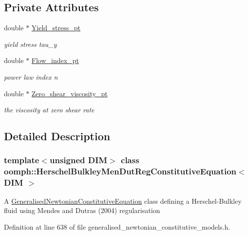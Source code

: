 \subsection*{Private Attributes}
\begin{DoxyCompactItemize}
\item 
double $\ast$ \hyperlink{classoomph_1_1HerschelBulkleyMenDutRegConstitutiveEquation_aaf7844f5794416ec2e625bf6c326b34f}{Yield\+\_\+stress\+\_\+pt}
\begin{DoxyCompactList}\small\item\em yield stress tau\+\_\+y \end{DoxyCompactList}\item 
double $\ast$ \hyperlink{classoomph_1_1HerschelBulkleyMenDutRegConstitutiveEquation_adb825a9e34ad0ab06023bfcfe6425f7d}{Flow\+\_\+index\+\_\+pt}
\begin{DoxyCompactList}\small\item\em power law index n \end{DoxyCompactList}\item 
double $\ast$ \hyperlink{classoomph_1_1HerschelBulkleyMenDutRegConstitutiveEquation_abe037e5299047cce1ef25e2ea1aebe3f}{Zero\+\_\+shear\+\_\+viscosity\+\_\+pt}
\begin{DoxyCompactList}\small\item\em the viscosity at zero shear rate \end{DoxyCompactList}\end{DoxyCompactItemize}


\subsection{Detailed Description}
\subsubsection*{template$<$unsigned D\+IM$>$\newline
class oomph\+::\+Herschel\+Bulkley\+Men\+Dut\+Reg\+Constitutive\+Equation$<$ D\+I\+M $>$}

A \hyperlink{classoomph_1_1GeneralisedNewtonianConstitutiveEquation}{Generalised\+Newtonian\+Constitutive\+Equation} class defining a Herschel-\/\+Bulkley fluid using Mendes and Dutra\textquotesingle{}s (2004) regularisation 

Definition at line 638 of file generalised\+\_\+newtonian\+\_\+constitutive\+\_\+models.\+h.



